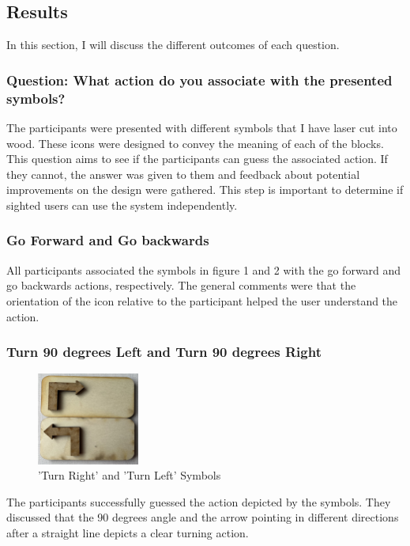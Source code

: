 \documentclass[oneside,%
                    author={Malak Hajji},
                    degree={BSc},
                    title={Designing An Accessible Computational Toolkit For Students},
                  subtitle={With Mixed Visual Abilities}]{dissertation}
\begin{document}
\subsection{Results}
In this section, I will discuss the different outcomes of each question.

\subsubsection{Question: What action do you associate with the presented symbols?}
The participants were presented with different symbols that I have laser cut into wood. These icons were designed to convey the meaning of each of the blocks. This question aims to see if the participants can guess the associated action. If they cannot, the answer was given to them and feedback about potential improvements on the design were gathered. This step is important to determine if sighted users can use the system independently.
\subsubsection{Go Forward and Go backwards}
All participants associated the symbols in figure 1 and 2 with the go forward and go backwards actions, respectively. The general comments were that the orientation of the icon relative to the participant helped the user understand the action. 

\subsubsection{Turn 90 degrees Left and Turn 90 degrees Right}
\FloatBarrier
\begin{figure}[h]
    \centering
    \includegraphics[width=0.3\textwidth]{thesis/turns.eps}
    \caption{'Turn Right' and 'Turn Left' Symbols}
    \label{fig-turn}
\end{figure}
\FloatBarrier
The participants successfully guessed the action depicted by the symbols. They discussed that the 90 degrees angle and the arrow pointing in different directions after a straight line depicts a clear turning action. 
\end{document}
